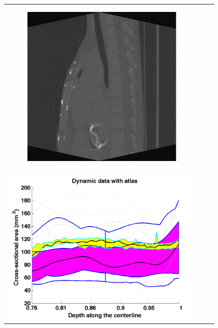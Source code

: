 \begin{figure}[tb]
  \begin{center}
    \begin{tabular}{ccc}
    \includegraphics[height=\figheight] {fig/Fleck_007.png}
    \includegraphics[width=\figwidth] {fig/Fleck_007_wfbplot.png} \\

\end{tabular}
\end{center}
\end{figure}
